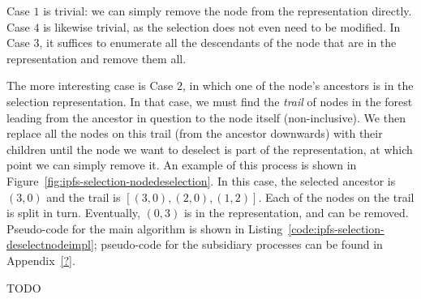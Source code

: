 \noindent Case $1$ is trivial: we can simply remove the node from the representation directly. Case $4$ is likewise trivial, as the selection does not even need to be modified. In Case $3$, it suffices to enumerate all the descendants of the node that are in the representation and remove them all.

The more interesting case is Case $2$, in which one of the node's ancestors is in the selection representation. In that case, we must find the \emph{trail} of nodes in the forest leading from the ancestor in question to the node itself (non-inclusive). We then replace all the nodes on this trail (from the ancestor downwards) with their children until the node we want to deselect is part of the representation, at which point we can simply remove it. An example of this process is shown in Figure~\ref{fig:ipfs-selection-nodedeselection}. In this case, the selected ancestor is $(3,0)$ and the trail is $[(3,0), (2,0), (1,2)]$. Each of the nodes on the trail is split in turn. Eventually, $(0,3)$ is in the representation, and can be removed. Pseudo-code for the main algorithm is shown in Listing~\ref{code:ipfs-selection-deselectnodeimpl}; pseudo-code for the subsidiary processes can be found in Appendix~\ref{?}.

TODO

